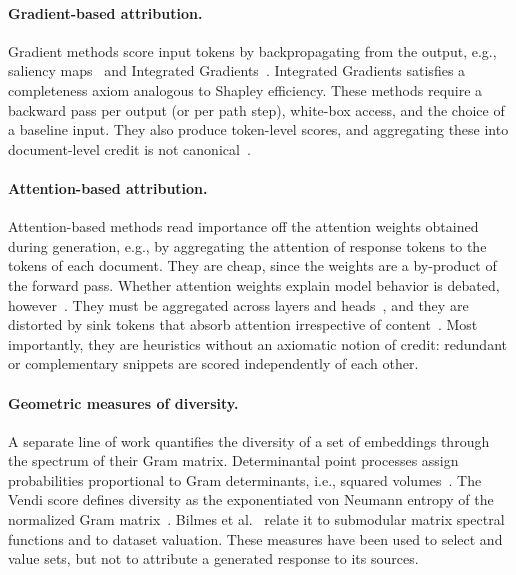 \documentclass{article}
\begin{document}
\paragraph{Gradient-based attribution.}
Gradient methods score input tokens by backpropagating from the output, e.g., saliency maps~\cite{simonyan2014deep} and Integrated Gradients~\cite{sundararajan2017axiomatic}. Integrated Gradients satisfies a completeness axiom analogous to Shapley efficiency. These methods require a backward pass per output (or per path step), white-box access, and the choice of a baseline input. They also produce token-level scores, and aggregating these into document-level credit is not canonical~\cite{nematov2025source}.

\paragraph{Attention-based attribution.}
Attention-based methods read importance off the attention weights obtained during generation, e.g., by aggregating the attention of response tokens to the tokens of each document. They are cheap, since the weights are a by-product of the forward pass. Whether attention weights explain model behavior is debated, however~\cite{jain2019attention, wiegreffe2019attention}. They must be aggregated across layers and heads~\cite{abnar2020quantifying}, and they are distorted by sink tokens that absorb attention irrespective of content~\cite{xiao2024efficient}. Most importantly, they are heuristics without an axiomatic notion of credit: redundant or complementary snippets are scored independently of each other.

\paragraph{Geometric measures of diversity.}
A separate line of work quantifies the diversity of a set of embeddings through the spectrum of their Gram matrix. Determinantal point processes assign probabilities proportional to Gram determinants, i.e., squared volumes~\cite{kulesza2012determinantal}. The Vendi score defines diversity as the exponentiated von Neumann entropy of the normalized Gram matrix~\cite{friedman2022vendi}. Bilmes et al.~\cite{bilmes2026dataset} relate it to submodular matrix spectral functions and to dataset valuation. These measures have been used to select and value sets, but not to attribute a generated response to its sources.
\end{document}

